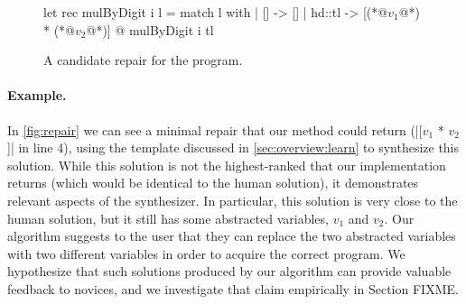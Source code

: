 \begin{figure}[ht]
  \begin{ecode}
  let rec mulByDigit i l =
    match l with
    | []     -> []
    | hd::tl -> [(*@$v_1$@*) * (*@$v_2$@*)] @ mulByDigit i tl
  \end{ecode}
  \caption{A candidate repair for the \mbd program.}
  \label{fig:repair}
  \end{figure}

\paragraph{Example.} In \autoref{fig:repair} we can see a minimal repair that
our method could return (|[$v_1$ * $v_2$]| in line 4), using the template
discussed in \autoref{sec:overview:learn} to synthesize this solution. While
this solution is not the highest-ranked that our implementation returns (which
would be identical to the human solution), it demonstrates relevant aspects of
the synthesizer. In particular, this solution is very close to the human
solution, but it still has some abstracted variables, $v_1$ and $v_2$. Our
algorithm suggests to the user that they can replace the two abstracted
variables with two different variables in order to acquire the correct program.
We hypothesize that such solutions produced by our algorithm can provide
valuable feedback to novices, and we investigate that claim empirically in
Section FIXME.
